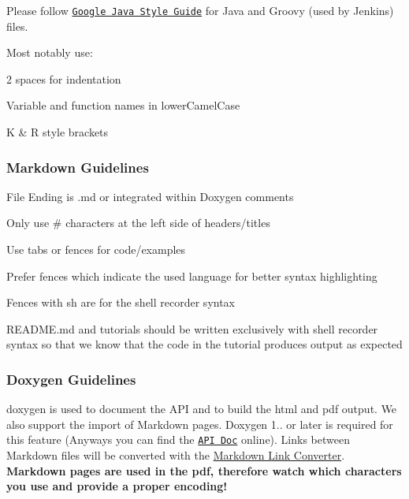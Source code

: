 Please follow \href{https://google.github.io/styleguide/javaguide.html}{\tt Google Java Style Guide} for Java and Groovy (used by Jenkins) files.

Most notably use\+:


\begin{DoxyItemize}
\item 2 spaces for indentation
\item Variable and function names in lower\+Camel\+Case
\item K \& R style brackets
\end{DoxyItemize}

\subsubsection*{Markdown Guidelines}


\begin{DoxyItemize}
\item File Ending is {\ttfamily .md} or integrated within Doxygen comments
\item Only use {\ttfamily \#} characters at the left side of headers/titles
\item Use tabs or fences for code/examples
\item Prefer fences which indicate the used language for better syntax highlighting
\item Fences with sh are for the shell recorder syntax
\item {\ttfamily R\+E\+A\+D\+M\+E.\+md} and tutorials should be written exclusively with shell recorder syntax so that we know that the code in the tutorial produces output as expected
\end{DoxyItemize}

\subsubsection*{Doxygen Guidelines}

{\ttfamily doxygen} is used to document the A\+PI and to build the html and pdf output. We also support the import of Markdown pages. Doxygen 1.. or later is required for this feature (Anyways you can find the \href{https://doc.libelektra.org/api/latest/html/}{\tt A\+PI Doc} online). Links between Markdown files will be converted with the \hyperlink{doc_markdownlinkconverter_README_md}{Markdown Link Converter}. {\bfseries Markdown pages are used in the pdf, therefore watch which characters you use and provide a proper encoding!}


